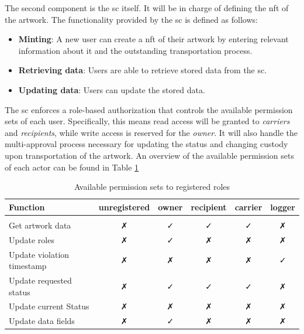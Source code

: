 The second component is the \gls{sc} itself. It will be in charge of defining the \gls{nft} of the artwork. 
The functionality provided by the \gls{sc} is defined as follows:

\begin{itemize}[align=left, font=\textit]
    \item \textbf{Minting}: A new user can create a \gls{nft} of their artwork by entering relevant information about it and the outstanding transportation process.
    \item \textbf{Retrieving data}: Users are able to retrieve stored data from the \gls{sc}.
    \item \textbf{Updating data}: Users can update the stored data.
\end{itemize}

The \gls{sc} enforces a role-based authorization that controls the available permission sets of each user. Specifically, this means read access will be granted to \textit{carriers} and \textit{recipients}, while write access is reserved for the \textit{owner}. It will also handle the multi-approval process necessary for updating the status and changing custody upon transportation of the artwork. An overview of the available permission sets of each actor can be found in Table \ref{tab:permission_sets}

\begin{table}
\begin{tabular}{l|ccccc}
\textbf{Function}          & \textbf{unregistered} & \textbf{owner}       & \textbf{recipient}   & \textbf{carrier}     & \textbf{logger}      \\ \hline
                           & \multicolumn{1}{l}{}  & \multicolumn{1}{l}{} & \multicolumn{1}{l}{} & \multicolumn{1}{l}{} & \multicolumn{1}{l}{} \\
Get artwork data           & ✗                     & ✓                    & ✓                    & ✓                    & ✗                    \\
Update roles               & ✗                     & ✓                    & ✗                    & ✗                    & ✗                    \\
Update violation timestamp & ✗                     & ✗                    & ✗                    & ✗                    & ✓                    \\
Update requested status    & ✗                     & ✓                    & ✓                    & ✓                    & ✗                    \\
Update current Status      & ✗                     & ✗                    & ✗                    & ✗                    & ✗                    \\
Update data fields         & ✗                     & ✓                    & ✗                    & ✗                    & ✗                   
\end{tabular}
\caption{Available permission sets to registered roles}
\label{tab:permission_sets}
\end{table}

